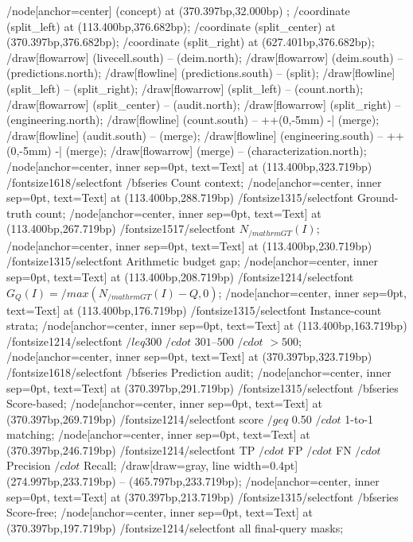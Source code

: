 /node[anchor=center] (concept) at (370.397bp,32.000bp) {};
/coordinate (split_left) at (113.400bp,376.682bp);
/coordinate (split_center) at (370.397bp,376.682bp);
/coordinate (split_right) at (627.401bp,376.682bp);
/draw[flowarrow] (livecell.south) -- (deim.north);
/draw[flowarrow] (deim.south) -- (predictions.north);
/draw[flowline] (predictions.south) -- (split);
/draw[flowline] (split_left) -- (split_right);
/draw[flowarrow] (split_left) -- (count.north);
/draw[flowarrow] (split_center) -- (audit.north);
/draw[flowarrow] (split_right) -- (engineering.north);
/draw[flowline] (count.south) -- ++(0,-5mm) -| (merge);
/draw[flowline] (audit.south) -- (merge);
/draw[flowline] (engineering.south) -- ++(0,-5mm) -| (merge);
/draw[flowarrow] (merge) -- (characterization.north);
/node[anchor=center, inner sep=0pt, text=Text] at (113.400bp,323.719bp) {/fontsize{16}{18}/selectfont /bfseries Count context};
/node[anchor=center, inner sep=0pt, text=Text] at (113.400bp,288.719bp) {/fontsize{13}{15}/selectfont  Ground-truth count};
/node[anchor=center, inner sep=0pt, text=Text] at (113.400bp,267.719bp) {/fontsize{15}{17}/selectfont  $N_{/mathrm{GT}}(I)$};
/node[anchor=center, inner sep=0pt, text=Text] at (113.400bp,230.719bp) {/fontsize{13}{15}/selectfont  Arithmetic budget gap};
/node[anchor=center, inner sep=0pt, text=Text] at (113.400bp,208.719bp) {/fontsize{12}{14}/selectfont  $G_Q(I)=/max(N_{/mathrm{GT}}(I)-Q,0)$};
/node[anchor=center, inner sep=0pt, text=Text] at (113.400bp,176.719bp) {/fontsize{13}{15}/selectfont  Instance-count strata};
/node[anchor=center, inner sep=0pt, text=Text] at (113.400bp,163.719bp) {/fontsize{12}{14}/selectfont  $/leq300$ $/cdot$ $301$--$500$ $/cdot$ $>500$};
/node[anchor=center, inner sep=0pt, text=Text] at (370.397bp,323.719bp) {/fontsize{16}{18}/selectfont /bfseries Prediction audit};
/node[anchor=center, inner sep=0pt, text=Text] at (370.397bp,291.719bp) {/fontsize{13}{15}/selectfont /bfseries Score-based};
/node[anchor=center, inner sep=0pt, text=Text] at (370.397bp,269.719bp) {/fontsize{12}{14}/selectfont  score $/geq$ 0.50 $/cdot$ 1-to-1 matching};
/node[anchor=center, inner sep=0pt, text=Text] at (370.397bp,246.719bp) {/fontsize{12}{14}/selectfont  TP $/cdot$ FP $/cdot$ FN $/cdot$ Precision $/cdot$ Recall};
/draw[draw=gray, line width=0.4pt] (274.997bp,233.719bp) -- (465.797bp,233.719bp);
/node[anchor=center, inner sep=0pt, text=Text] at (370.397bp,213.719bp) {/fontsize{13}{15}/selectfont /bfseries Score-free};
/node[anchor=center, inner sep=0pt, text=Text] at (370.397bp,197.719bp) {/fontsize{12}{14}/selectfont  all final-query masks};
